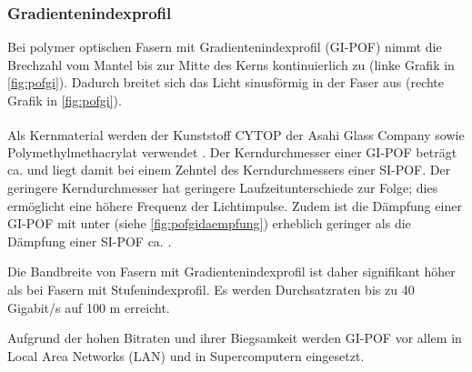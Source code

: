 \subsubsection{Gradientenindexprofil}

Bei polymer optischen Fasern mit Gradientenindexprofil (GI-POF) nimmt die
Brechzahl vom Mantel bis zur Mitte des Kerns kontinuierlich zu (linke Grafik in
\autoref{fig:pofgi}). Dadurch breitet sich das Licht sinusförmig in der Faser
aus (rechte Grafik in \autoref{fig:pofgi}).

Als Kernmaterial werden der Kunststoff CYTOP\textsuperscript{\texttrademark} der
Asahi Glass Company sowie Polymethylmethacrylat verwendet \cite{pofacgif}. Der
Kerndurchmesser einer GI-POF beträgt ca.  und liegt damit bei
einem Zehntel des Kerndurchmessers einer SI-POF. Der geringere Kerndurchmesser
hat geringere Laufzeitunterschiede zur Folge; dies ermöglicht eine höhere
Frequenz der Lichtimpulse. Zudem ist die Dämpfung einer GI-POF mit unter
 (siehe \autoref{fig:pofgidaempfung}) erheblich geringer als
die Dämpfung einer SI-POF ca. .

Die Bandbreite von Fasern mit Gradientenindexprofil ist daher signifikant höher
als bei Fasern mit Stufenindexprofil. Es werden Durchsatzraten bis zu 40
Gigabit/s auf 100 m erreicht.

Aufgrund der hohen Bitraten und ihrer Biegsamkeit werden GI-POF vor allem in
\glqq Local Area Networks\grqq{} (LAN) und in Supercomputern eingesetzt.
\cite{poflee}

